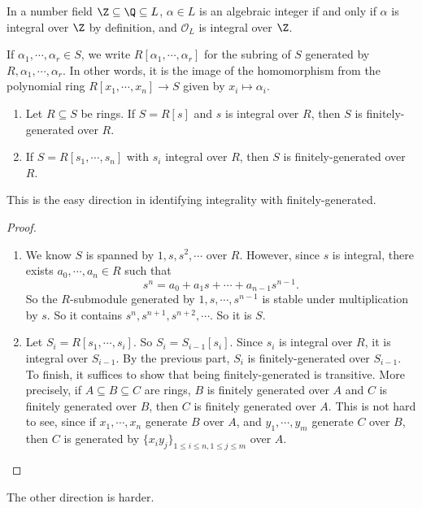 \documentclass[a4paper]{article}
\begin{document}
\begin{eg}
  In a number field $\Z \subseteq \Q \subseteq L$, $\alpha \in L$ is an algebraic integer if and only if $\alpha$ is integral over $\Z$ by definition, and $\mathcal{O}_L$ is integral over $\Z$.
\end{eg}

\begin{notation}
  If $\alpha_1, \cdots, \alpha_r \in S$, we write $R[\alpha_1, \cdots, \alpha_r]$ for the subring of $S$ generated by $R, \alpha_1, \cdots, \alpha_r$. In other words, it is the image of the homomorphism from the polynomial ring $R[x_1, \cdots, x_n] \to S$ given by $x_i \mapsto \alpha_i$.
\end{notation}

\begin{prop}\leavevmode
  \begin{enumerate}
    \item Let $R \subseteq S$ be rings. If $S = R[s]$ and $s$ is integral over $R$, then $S$ is finitely-generated over $R$.
    \item If $S = R[s_1, \cdots, s_n]$ with $s_i$ integral over $R$, then $S$ is finitely-generated over $R$.
  \end{enumerate}
\end{prop}
This is the easy direction in identifying integrality with finitely-generated.

\begin{proof}\leavevmode
  \begin{enumerate}
    \item We know $S$ is spanned by $1, s, s^2, \cdots$ over $R$. However, since $s$ is integral, there exists $a_0, \cdots, a_n \in R$ such that
      \[
        s^n = a_0 + a_1 s + \cdots + a_{n - 1}s^{n - 1}.
      \]
      So the $R$-submodule generated by $1, s, \cdots, s^{n - 1}$ is stable under multiplication by $s$. So it contains $s^n, s^{n + 1}, s^{n + 2}, \cdots$. So it is $S$.
    \item Let $S_i = R[s_1, \cdots, s_i]$. So $S_i = S_{i - 1}[s_i]$. Since $s_i$ is integral over $R$, it is integral over $S_{i - 1}$. By the previous part, $S_i$ is finitely-generated over $S_{i - 1}$. To finish, it suffices to show that being finitely-generated is transitive. More precisely, if $A \subseteq B \subseteq C$ are rings, $B$ is finitely generated over $A$ and $C$ is finitely generated over $B$, then $C$ is finitely generated over $A$. This is not hard to see, since if $x_1, \cdots, x_n$ generate $B$ over $A$, and $y_1, \cdots, y_m$ generate $C$ over $B$, then $C$ is generated by $\{x_i y_j\}_{1 \leq i \leq n,1 \leq j \leq m}$ over $A$.
  \end{enumerate}
\end{proof}
The other direction is harder.
\end{document}
